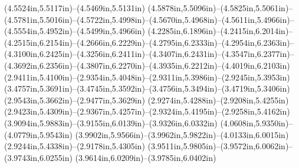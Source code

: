 (4.5524in,5.5117in)--(4.5469in,5.5131in) (4.5878in,5.5096in)--(4.5825in,5.5061in)--(4.5781in,5.5016in)--(4.5722in,5.4998in)--(4.5670in,5.4968in)--(4.5611in,5.4966in)--(4.5554in,5.4952in)--(4.5499in,5.4966in) (4.2285in,6.1896in)--(4.2415in,6.2014in)--(4.2515in,6.2154in)--(4.2666in,6.2229in)--(4.2795in,6.2333in)--(4.2954in,6.2363in)--(4.3100in,6.2425in)--(4.3256in,6.2411in)--(4.3407in,6.2431in)--(4.3547in,6.2377in)--(4.3692in,6.2356in)--(4.3807in,6.2270in)--(4.3935in,6.2212in)--(4.4019in,6.2103in) (2.9411in,5.4100in)--(2.9354in,5.4048in)--(2.9311in,5.3986in)--(2.9245in,5.3953in) (3.4757in,5.3691in)--(3.4745in,5.3592in)--(3.4756in,5.3494in)--(3.4719in,5.3406in) (2.9543in,5.3662in)--(2.9477in,5.3629in) (2.9274in,5.4288in)--(2.9208in,5.4255in) (2.9423in,5.4309in)--(2.9367in,5.4257in)--(2.9324in,5.4195in)--(2.9258in,5.4162in) (3.9094in,5.9883in)--(3.9155in,6.0139in)--(3.9326in,6.0332in) (4.0608in,5.9350in)--(4.0779in,5.9543in) (3.9902in,5.9566in)--(3.9962in,5.9822in)--(4.0133in,6.0015in) (2.9244in,5.4338in)--(2.9178in,5.4305in) (3.9511in,5.9805in)--(3.9572in,6.0062in)--(3.9743in,6.0255in) (3.9614in,6.0209in)--(3.9785in,6.0402in)
